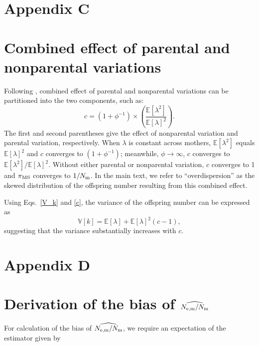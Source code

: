 \documentclass[12pt, English]{article}
\begin{document}
\begin{spacing}{1.9}
\section*{Appendix C}
\setcounter{equation}{0}
\section*{Combined effect of parental and nonparental variations}

\renewcommand{\theequation}{C\arabic{equation}}

Following \cite{Akita_2019}, combined effect of parental and nonparental variations can be partitioned into the two components, such as: 
\begin{equation}
c = (1+\phi^{-1}) \times \left(\frac{\mathbb{E}[\lambda^2]}{\mathbb{E}[\lambda]^2}\right). 
\label{c}
\end{equation}
The first and second parentheses give the effect of nonparental variation and parental variation, respectively. When $\lambda$ is constant across mothers, $\mathbb{E}[\lambda^2]$ equals $\mathbb{E}[\lambda]^2$ and $c$ converges to $(1+\phi^{-1})$; meanwhile, $\phi \to \infty$, $c$ converges to $\mathbb{E}[\lambda^2]/\mathbb{E}[\lambda]^2$. Without either parental or nonparental variation, $c$ converges to 1 and $\pi_{\rm MS}$ converges to $1/N_{\rm m}$. In the main text, we refer to ``overdispersion'' as the skewed distribution of the offspring number resulting from this combined effect. 

Using Eqs.~\ref{V_k} and \ref{c}, the variance of the offspring number can be expressed as  
\begin{equation}
\mathbb{V}[k] = \mathbb{E}[\lambda] + \mathbb{E}[\lambda]^2 (c-1),  
\label{V_k2}
\end{equation}
suggesting that the variance substantially increases with $c$.

\section*{Appendix D}
\setcounter{equation}{0}
\section*{Derivation of the bias of $\widehat{N_{\rm e,m}/N_{\rm m}}$}
\renewcommand{\theequation}{D\arabic{equation}}

For calculation of the bias of $\widehat{N_{\rm e,m}/N_{\rm m}}$, we require an expectation of the estimator given by


\end{spacing}
\end{document}
